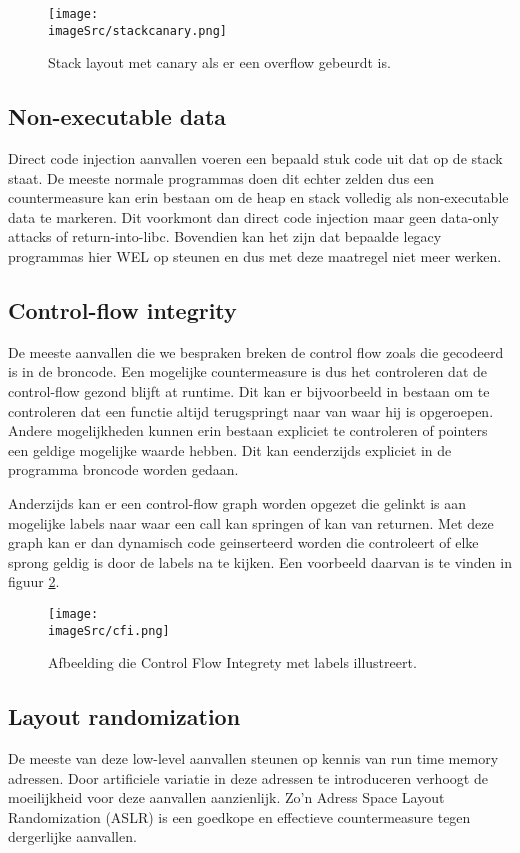 \documentclass[../main.tex]{subfiles}
\begin{document}
\begin{figure}
\centering
\texttt{[image: \\imageSrc/stackcanary.png]}
\caption{Stack layout met canary als er een overflow gebeurdt is.}
\label{f:stackcanary}
\end{figure}

\subsection{Non-executable data}
Direct code injection aanvallen voeren een bepaald stuk code uit dat op de stack staat.
De meeste normale programmas doen dit echter zelden dus een countermeasure kan erin bestaan om de heap en stack volledig als non-executable data te markeren.
Dit voorkmont dan direct code injection maar geen data-only attacks of return-into-libc.
Bovendien kan het zijn dat bepaalde legacy programmas hier WEL op steunen en dus met deze maatregel niet meer werken.

\subsection{Control-flow integrity}
De meeste aanvallen die we bespraken breken de control flow zoals die gecodeerd is in de broncode.
Een mogelijke countermeasure is dus het controleren dat de control-flow gezond blijft at runtime.
Dit kan er bijvoorbeeld in bestaan om te controleren dat een functie altijd terugspringt naar van waar hij is opgeroepen.
Andere mogelijkheden kunnen erin bestaan expliciet te controleren of pointers een geldige mogelijke waarde hebben.
Dit kan eenderzijds expliciet in de programma broncode worden gedaan.

Anderzijds kan er een control-flow graph worden opgezet die gelinkt is aan mogelijke labels naar waar een call kan springen of kan van returnen.
Met deze graph kan er dan dynamisch code geinserteerd worden die controleert of elke sprong geldig is door de labels na te kijken. 
Een voorbeeld daarvan is te vinden in figuur \ref{f:cfi}.

\begin{figure}
\centering
\texttt{[image: \\imageSrc/cfi.png]}
\caption{Afbeelding die Control Flow Integrety met labels illustreert.}
\label{f:cfi}
\end{figure}

\subsection{Layout randomization}
De meeste van deze low-level aanvallen steunen op kennis van run time memory adressen.
Door artificiele variatie in deze adressen te introduceren verhoogt de moeilijkheid voor deze aanvallen aanzienlijk. 
Zo'n Adress Space Layout Randomization (ASLR) is een goedkope en effectieve countermeasure tegen dergerlijke aanvallen.
\end{document}
